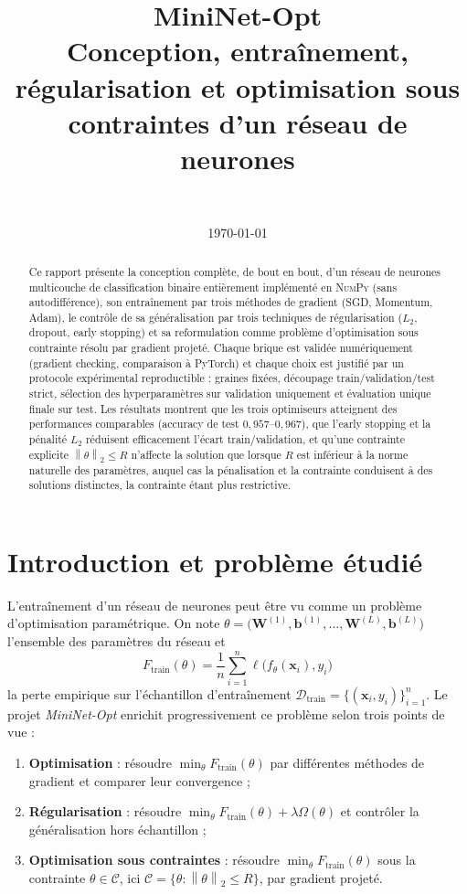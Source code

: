 \documentclass[11pt,a4paper]{article}
\title{\textbf{MiniNet-Opt}\\[4pt]
\large Conception, entraînement, régularisation et optimisation sous contraintes d'un réseau de neurones}
\author{\NomEtudiant\\[2pt] \Classe}
\date{\today}
\newcommand{\norm}[1]{\left\lVert #1 \right\rVert}
\newcommand{\vect}[1]{\mathbf{#1}}
\begin{document}
\maketitle

\begin{abstract}
Ce rapport présente la conception complète, de bout en bout, d'un réseau de neurones multicouche de classification binaire entièrement implémenté en \textsc{NumPy} (sans autodifférence), son entraînement par trois méthodes de gradient (SGD, Momentum, Adam), le contrôle de sa généralisation par trois techniques de régularisation ($L_2$, dropout, early stopping) et sa reformulation comme problème d'optimisation sous contrainte résolu par gradient projeté. Chaque brique est validée numériquement (gradient checking, comparaison à PyTorch) et chaque choix est justifié par un protocole expérimental reproductible : graines fixées, découpage train/validation/test strict, sélection des hyperparamètres sur validation uniquement et évaluation unique finale sur test. Les résultats montrent que les trois optimiseurs atteignent des performances comparables (accuracy de test $0{,}957$--$0{,}967$), que l'early stopping et la pénalité $L_2$ réduisent efficacement l'écart train/validation, et qu'une contrainte explicite $\norm{\theta}_2 \le R$ n'affecte la solution que lorsque $R$ est inférieur à la norme naturelle des paramètres, auquel cas la pénalisation et la contrainte conduisent à des solutions distinctes, la contrainte étant plus restrictive.
\end{abstract}

\tableofcontents

\section{Introduction et problème étudié}
\label{sec:intro}

L'entraînement d'un réseau de neurones peut être vu comme un problème d'optimisation paramétrique. On note $\theta = \bigl(\vect{W}^{(1)}, \vect{b}^{(1)}, \dots, \vect{W}^{(L)}, \vect{b}^{(L)}\bigr)$ l'ensemble des paramètres du réseau et
\[
F_{\mathrm{train}}(\theta) = \frac{1}{n} \sum_{i=1}^{n} \ell\bigl(f_\theta(\vect{x}_i), y_i\bigr)
\]
la perte empirique sur l'échantillon d'entraînement $\mathcal{D}_{\mathrm{train}} = \{(\vect{x}_i, y_i)\}_{i=1}^n$. Le projet \emph{MiniNet-Opt} enrichit progressivement ce problème selon trois points de vue :

\begin{enumerate}
  \item \textbf{Optimisation} : résoudre $\min_\theta F_{\mathrm{train}}(\theta)$ par différentes méthodes de gradient et comparer leur convergence ;
  \item \textbf{Régularisation} : résoudre $\min_\theta F_{\mathrm{train}}(\theta) + \lambda \Omega(\theta)$ et contrôler la généralisation hors échantillon ;
  \item \textbf{Optimisation sous contraintes} : résoudre $\min_\theta F_{\mathrm{train}}(\theta)$ sous la contrainte $\theta \in \mathcal{C}$, ici $\mathcal{C} = \{\theta : \norm{\theta}_2 \le R\}$, par gradient projeté.
\end{enumerate}
\end{document}

